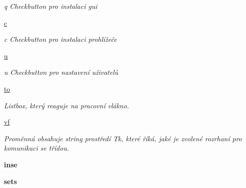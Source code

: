 \begin{DoxyCompactItemize}
\begin{DoxyCompactList}\small\item\em q Checkbutton pro instalaci gui \end{DoxyCompactList}\item 
\hypertarget{classcloseSetup_1_1App_ae453555f6831b9dc767a21015cb31def}{\hyperlink{classcloseSetup_1_1App_ae453555f6831b9dc767a21015cb31def}{c}}\label{df/df9/classcloseSetup_1_1App_ae453555f6831b9dc767a21015cb31def}

\begin{DoxyCompactList}\small\item\em c Checkbutton pro instalaci prohlížeče \end{DoxyCompactList}\item 
\hypertarget{classcloseSetup_1_1App_a7e042f9b8bfd9fa5127cd1e441565c47}{\hyperlink{classcloseSetup_1_1App_a7e042f9b8bfd9fa5127cd1e441565c47}{u}}\label{df/df9/classcloseSetup_1_1App_a7e042f9b8bfd9fa5127cd1e441565c47}

\begin{DoxyCompactList}\small\item\em u Checkbutton pro nastavení uživatelů \end{DoxyCompactList}\item 
\hypertarget{classcloseSetup_1_1App_aaa2a4bd5fda6cec284fe6daf84e1c011}{\hyperlink{classcloseSetup_1_1App_aaa2a4bd5fda6cec284fe6daf84e1c011}{to}}\label{df/df9/classcloseSetup_1_1App_aaa2a4bd5fda6cec284fe6daf84e1c011}

\begin{DoxyCompactList}\small\item\em Listbox, který reaguje na pracovní vlákno. \end{DoxyCompactList}\item 
\hypertarget{classcloseSetup_1_1App_a42d2236c367bf363aed1f2c5368f0190}{\hyperlink{classcloseSetup_1_1App_a42d2236c367bf363aed1f2c5368f0190}{vf}}\label{df/df9/classcloseSetup_1_1App_a42d2236c367bf363aed1f2c5368f0190}

\begin{DoxyCompactList}\small\item\em Proměnná obsahuje string prostředí Tk, které říká, jaké je zvolené rozrhaní pro komunikaci se třídou. \end{DoxyCompactList}\item 
\hypertarget{classcloseSetup_1_1App_a403f37a9f1d4fe216a64cc1ede452ba7}{{\bfseries inse}}\label{df/df9/classcloseSetup_1_1App_a403f37a9f1d4fe216a64cc1ede452ba7}

\item 
\hypertarget{classcloseSetup_1_1App_a68a2f49839e5e6763fb2211fd2a2cbea}{{\bfseries sets}}\label{df/df9/classcloseSetup_1_1App_a68a2f49839e5e6763fb2211fd2a2cbea}

\end{DoxyCompactItemize}


